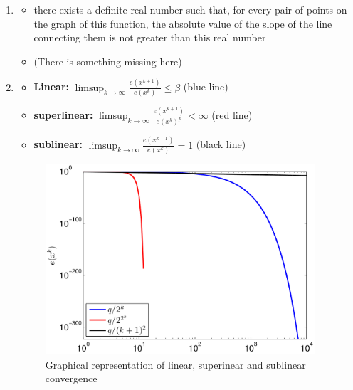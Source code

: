 \documentclass{report}
\begin{document}
\begin{enumerate}
\begin{itemize}
\begin{itemize}
	\end{itemize}
\end{itemize}

\item \begin{itemize}

	\item  there exists a definite real number such that, for every pair of points on the graph of this function, the absolute value of the slope of the line connecting them is not greater than this real number
	
	\item (There is something missing here)
	
\end{itemize}

\item 
\begin{itemize}
	\item \textbf{Linear:} $\limsup_{k \rightarrow \infty} \frac{e(x^{k+1})}{e(x^k)}\leq \beta$ (blue line)
	\item \textbf{superlinear:} $\limsup_{k \rightarrow \infty} \frac{e(x^{k+1})}{e(x^k)^p} < \infty$ (red line)
	\item \textbf{sublinear:} $\limsup_{k \rightarrow \infty} \frac{e(x^{k+1})}{e(x^k)} = 1$ (black line)
\end{itemize}

\begin{figure}[H]
\includegraphics[width=10cm]{convergence.png}
\caption{Graphical representation of linear, superinear and sublinear convergence \label{fig:desc_dir}}
\end{figure}


\end{enumerate}
\end{document}
